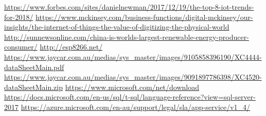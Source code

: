 \documentclass{article}
\begin{document}
    \begin{thebibliography}{9}
        \raggedright
            \url{https://www.forbes.com/sites/danielnewman/2017/12/19/the-top-8-iot-trends-for-2018/}
            \url{https://www.mckinsey.com/business-functions/digital-mckinsey/our-insights/the-internet-of-things-the-value-of-digitizing-the-physical-world}
            \url{http://sunnewsonline.com/china-is-worlds-largest-renewable-energy-producer-consumer/}
            \url{http://esp8266.net/}
            \url{https://www.jaycar.com.au/medias/sys_master/images/9105858396190/XC4444-dataSheetMain.pdf}
            \url{https://www.jaycar.com.au/medias/sys_master/images/9091897786398/XC4520-dataSheetMain.zip}
            \url{https://www.microsoft.com/net/download}
            \url{https://docs.microsoft.com/en-us/sql/t-sql/language-reference?view=sql-server-2017}
            \url{https://azure.microsoft.com/en-au/support/legal/sla/app-service/v1_4/}
    \end{thebibliography}

    
\end{document}
